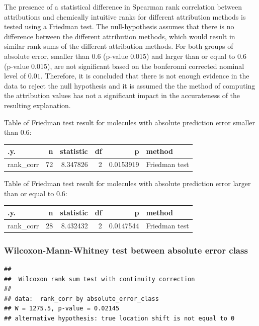 \documentclass[
  12pt,
  a4paper]{article}
\begin{document}
The presence of a statistical difference in Spearman rank correlation
between attributions and chemically intuitive ranks for different
attribution methods is tested using a Friedman test. The null-hypothesis
assumes that there is no difference between the different attribution
methods, which would result in similar rank sums of the different
attribution methods. For both groups of absolute error, smaller than
\(0.6\) (p-value 0.015) and larger than or equal to \(0.6\) (p-value
0.015), are not significant based on the bonferonni corrected nominal
level of \(0.01\). Therefore, it is concluded that there is not enough
evidence in the data to reject the null hypothesis and it is assumed the
the method of computing the attribution values has not a significant
impact in the accurateness of the resulting explanation.

Table of Friedman test result for molecules with absolute prediction
error smaller than \(0.6\):

\begin{longtable}[]{@{}lrrrrl@{}}
\toprule\noalign{}
.y. & n & statistic & df & p & method \\
\midrule\noalign{}
\endhead
\bottomrule\noalign{}
\endlastfoot
rank\_corr & 72 & 8.347826 & 2 & 0.0153919 & Friedman test \\
\end{longtable}

Table of Friedman test result for molecules with absolute prediction
error larger than or equal to \(0.6\):

\begin{longtable}[]{@{}lrrrrl@{}}
\toprule\noalign{}
.y. & n & statistic & df & p & method \\
\midrule\noalign{}
\endhead
\bottomrule\noalign{}
\endlastfoot
rank\_corr & 28 & 8.432432 & 2 & 0.0147544 & Friedman test \\
\end{longtable}

\hypertarget{wilcoxon-mann-whitney-test-between-absolute-error-class}{%
\subsubsection{Wilcoxon-Mann-Whitney test between absolute error
class}\label{wilcoxon-mann-whitney-test-between-absolute-error-class}}

\begin{verbatim}
## 
##  Wilcoxon rank sum test with continuity correction
## 
## data:  rank_corr by absolute_error_class
## W = 1275.5, p-value = 0.02145
## alternative hypothesis: true location shift is not equal to 0
\end{verbatim}
\end{document}
